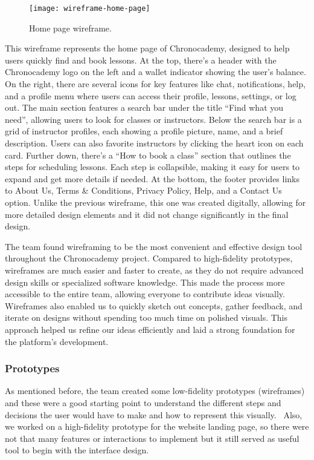 \begin{figure}[h]
    \centering
    \texttt{[image: wireframe-home-page]}
    \caption{Home page wireframe.}
    \label{fig:figure22}
\end{figure}
This wireframe represents the home page of Chronocademy, designed to help users quickly find and book lessons.
At the top, there’s a header with the Chronocademy logo on the left and a wallet indicator showing the user's balance.
On the right, there are several icons for key features like chat, notifications, help, and a profile menu where users can access their profile, lessons, settings, or log out.
The main section features a search bar under the title ``Find what you need'', allowing users to look for classes or instructors.
Below the search bar is a grid of instructor profiles, each showing a profile picture, name, and a brief description.
Users can also favorite instructors by clicking the heart icon on each card.
Further down, there’s a ``How to book a class'' section that outlines the steps for scheduling lessons.
Each step is collapsible, making it easy for users to expand and get more details if needed.
At the bottom, the footer provides links to About Us, Terms \& Conditions, Privacy Policy, Help, and a Contact Us option.
Unlike the previous wireframe, this one was created digitally, allowing for more detailed design elements and it did not change significantly in the final design.

The team found wireframing to be the most convenient and effective design tool throughout the Chronocademy project.
Compared to high-fidelity prototypes, wireframes are much easier and faster to create, as they do not require advanced design skills or specialized software knowledge.
This made the process more accessible to the entire team, allowing everyone to contribute ideas visually.
Wireframes also enabled us to quickly sketch out concepts, gather feedback, and iterate on designs without spending too much time on polished visuals.
This approach helped us refine our ideas efficiently and laid a strong foundation for the platform’s development.

\subsubsection{Prototypes}\label{subsubsec:prototypes}
As mentioned before, the team created some low-fidelity prototypes (wireframes) and these were a good starting point to understand the different steps and decisions the user would have to make and how to represent this visually. \ Also, we worked on a high-fidelity prototype for the website landing page, so there were not that many features or interactions to implement but it still served as useful tool to begin with the interface design.

